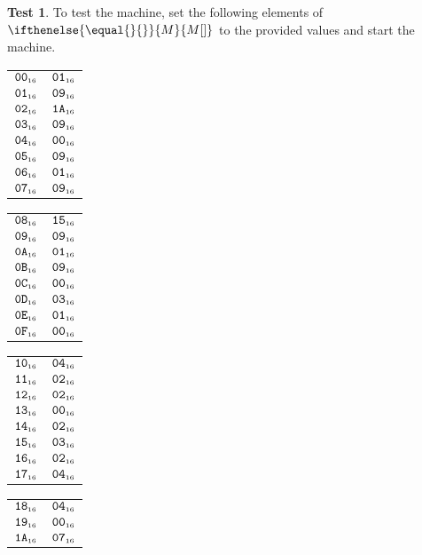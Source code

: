 \documentclass[a4paper,12pt]{article}
\makeatletter
\newcommand{\num}[1]{\texttt{#1}}
\newcommand{\hex}[1]{\num{#1}_{\textup{\tiny 16}}}
\newcommand{\MEM}[1]{\ifthenelse{\equal{#1}{}}{M}{M[#1]}}
\theoremstyle{definition}
\newtheorem{test}{Test}
\newenvironment{memtable}{%
  \begin{trivlist}
    \item
    }{%
    \end{trivlist}}
\newenvironment{memcolumn}{%
  \begin{tabular}{@{}ll@{}}
    \hline}
    {%
    \hline
  \end{tabular}}
\newcommand{\memspace}{\qquad}
\makeatother
\begin{document}
\begin{test}
  To test the machine, set the following elements of $\MEM{}$ to the provided values and start the machine.
  \begin{memtable}
    \begin{memcolumn}
      $\hex{00}$ & $\hex{01}$ \\
      $\hex{01}$ & $\hex{09}$ \\
      $\hex{02}$ & $\hex{1A}$ \\
      $\hex{03}$ & $\hex{09}$ \\
      $\hex{04}$ & $\hex{00}$ \\
      $\hex{05}$ & $\hex{09}$ \\
      $\hex{06}$ & $\hex{01}$ \\
      $\hex{07}$ & $\hex{09}$ \\
    \end{memcolumn}
    \memspace
    \begin{memcolumn}
      $\hex{08}$ & $\hex{15}$ \\
      $\hex{09}$ & $\hex{09}$ \\
      $\hex{0A}$ & $\hex{01}$ \\
      $\hex{0B}$ & $\hex{09}$ \\
      $\hex{0C}$ & $\hex{00}$ \\
      $\hex{0D}$ & $\hex{03}$ \\
      $\hex{0E}$ & $\hex{01}$ \\
      $\hex{0F}$ & $\hex{00}$ \\
    \end{memcolumn}
    \memspace
    \begin{memcolumn}
      $\hex{10}$ & $\hex{04}$ \\
      $\hex{11}$ & $\hex{02}$ \\
      $\hex{12}$ & $\hex{02}$ \\
      $\hex{13}$ & $\hex{00}$ \\
      $\hex{14}$ & $\hex{02}$ \\
      $\hex{15}$ & $\hex{03}$ \\
      $\hex{16}$ & $\hex{02}$ \\
      $\hex{17}$ & $\hex{04}$ \\
    \end{memcolumn}
    \memspace
    \begin{memcolumn}
      $\hex{18}$ & $\hex{04}$ \\
      $\hex{19}$ & $\hex{00}$ \\
      $\hex{1A}$ & $\hex{07}$ \\

\end{memcolumn}
\end{memtable}
\end{test}
\end{document}
